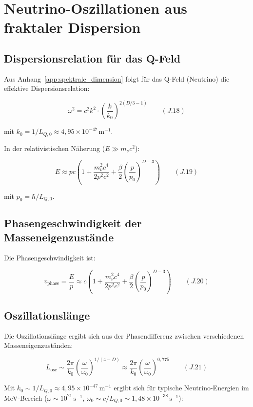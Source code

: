 \section{Neutrino-Oszillationen aus fraktaler Dispersion}
\label{app:neutrino_oszillation_oszillationen}

\subsection{Dispersionsrelation für das Q-Feld}
\label{sub:neutrino_oszillation_dispersion}

Aus Anhang~\ref{app:spektrale_dimension} folgt für das Q-Feld (Neutrino) die effektive Dispersionsrelation:

\[
\omega^2 = c^2 k^2 \cdot \left( \frac{k}{k_0} \right)^{2(D/3-1)} \qquad (J.18)
\]

mit \( k_0 = 1/L_{Q,0} \approx 4{,}95 \times 10^{-47} \, \text{m}^{-1} \).

In der relativistischen Näherung (\( E \gg m_\nu c^2 \)):

\[
E \approx pc \left(1 + \frac{m_\nu^2 c^4}{2p^2 c^2} + \frac{\beta}{2} \left(\frac{p}{p_0}\right)^{D-3}\right) \qquad (J.19)
\]

mit \( p_0 = \hbar/L_{Q,0} \).

\subsection{Phasengeschwindigkeit der Masseneigenzustände}
\label{sub:neutrino_oszillation_phasengeschw}

Die Phasengeschwindigkeit ist:

\[
v_{\text{phase}} = \frac{E}{p} \approx c \left(1 + \frac{m_\nu^2 c^4}{2p^2 c^2} + \frac{\beta}{2} \left(\frac{p}{p_0}\right)^{D-3}\right) \qquad (J.20)
\]

\subsection{Oszillationslänge}
\label{sub:neutrino_oszillation_laenge}

Die Oszillationslänge ergibt sich aus der Phasendifferenz zwischen verschiedenen Masseneigenzuständen:

\[
L_{\text{osc}} \sim \frac{2\pi}{k_0} \left( \frac{\omega}{\omega_0} \right)^{1/(4-D)} 
\approx \frac{2\pi}{k_0} \left( \frac{\omega}{\omega_0} \right)^{0,775} \qquad (J.21)
\]

Mit \( k_0 \sim 1/L_{Q,0} \approx 4{,}95 \times 10^{-47} \, \text{m}^{-1} \) ergibt sich für typische Neutrino-Energien im MeV-Bereich (\( \omega \sim 10^{21} \, \text{s}^{-1} \), \( \omega_0 \sim c/L_{Q,0} \sim 1{,}48 \times 10^{-38} \, \text{s}^{-1} \)):

